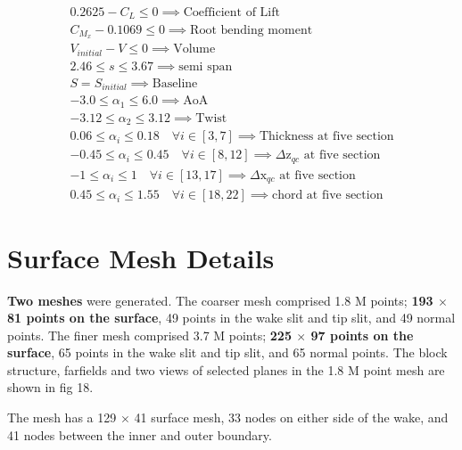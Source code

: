 $$  
\begin{aligned} 
{0.2625-C_{L} \leq 0} \implies \text{Coefficient of Lift} \\ 
{C_{M_{x}}-0.1069 \leq 0} \implies \text{Root bending moment}\\
{V_{initial}-V \leq 0} \implies \text{Volume}\\ 
{2.46 \leq s \leq 3.67} \implies \text{semi span}\\ 
{S} = S_{initial} \implies \text{Baseline } \\
 {-3.0} \leq \alpha_{1} \leq 6.0 \implies \text{AoA} \\
 -3.12  \leq \alpha_{2} \leq 3.12 \implies \text{Twist}\\
 0.06  \leq \alpha_{i} \leq 0.18 \quad \forall i \in[3,7] \implies \text{Thickness at five section}\\
 -0.45  \leq \alpha_{i} \leq 0.45 \quad \forall i \in[8,12] \implies \text{$\Delta$z$_{qc}$ at five section}\\
 -1  \leq \alpha_{i} \leq 1 \quad \forall i \in[13,17] \implies \text{$\Delta$x$_{qc}$ at five section}\\
 0.45  \leq \alpha_{i} \leq 1.55 \quad \forall i \in[18,22] \implies \text{chord at five section}
 \end{aligned}
$$ 

\section{Surface Mesh Details}
\textbf{Two meshes}\cite{control} were generated. The coarser mesh comprised 1.8 M points; \textbf{193 $\times$ 81 points on the surface}, 49 points in the wake slit and tip slit, and 49 normal points. The finer mesh comprised 3.7 M points; \textbf{225 $\times$ 97 points on the surface}, 65 points in the wake slit and tip slit, and 65 normal points. The block structure, farfields and two views of selected planes in the 1.8 M point mesh are shown in fig 18.

The mesh has a 129 $\times$ 41 surface mesh, 33 nodes on either side of the wake, and 41 nodes between the inner and outer boundary.\cite{Poole1}